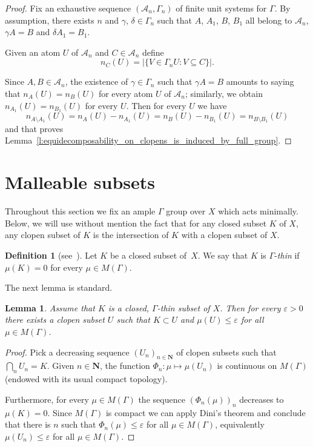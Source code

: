 \documentclass[10pt,a4paper]{article}
\newtheorem{lemm}[theo]{Lemma}
\theoremstyle{definition}
\newtheorem{defi}[theo]{Definition}
\newcommand{\N}{\mathbf{N}}
\newcommand{\mcA}{\mathcal{A}}
\begin{document}
\begin{proof}
Fix an exhaustive sequence $(\mcA_n,\Gamma_n)$ of finite unit systems for $\Gamma$. By assumption, there exists $n$ and $\gamma$, $\delta \in \Gamma_n$ such that $A$, $A_1$, $B$, $B_1$ all belong to $\mcA_n$, $\gamma A=B$ and $\delta A_1=B_1$.

Given an atom $U$ of $\mcA_n$ and $C \in \mcA_n$ define
\[
n_C(U)= \left|\{V \in \Gamma_n U : V \subseteq C\}\right|.
\]

Since $A,B \in \mcA_n$, the existence of $\gamma \in \Gamma_n$ such that $\gamma A=B$ amounts to saying that $n_A(U)=n_B(U)$ for every atom $U$ of $\mcA_n$; similarly, we obtain $n_{A_1}(U)= n_{B_1}(U)$ for every $U$. Then for every $U$ we have
\[
n_{A \setminus A_1}(U)=n_A(U) - n_{A_1}(U) = n_B(U)-n_{B_1}(U) = n_{B \setminus B_1}(U)
\]
and that proves Lemma~\ref{l:equidecomposability_on_clopens_is_induced_by_full_group}.
\end{proof}


\section{Malleable subsets}

Throughout this section we fix an ample $\Gamma$ group over $X$ which acts minimally. Below, we will use without mention the fact that for any closed subset $K$ of $X$, any clopen subset of $K$ is the intersection of $K$ with a clopen subset of $X$.

\begin{defi}
[{see~\cite[Definition~4.11]{Giordano2004}}]
Let $K$ be a closed subset of~$X$. We say that $K$ is $\Gamma$-\emph{thin} if $\mu(K)=0$ for every $\mu \in M(\Gamma)$.
\end{defi}

The next lemma is standard.

\begin{lemm}\label{l:small_clopen}
Assume that $K$ is a closed, $\Gamma$-thin subset of $X$. Then for every $\varepsilon >0$ there exists a clopen subset $U$ such that $K \subset U$ and $\mu(U) \le \varepsilon$ for all $\mu \in M(\Gamma)$.
\end{lemm}

\begin{proof}
Pick a decreasing sequence $(U_n)_{n \in \N}$ of clopen subsets such that\linebreak ${\bigcap_n U_n = K}$. Given $n \in \N$, the function $\Phi_n \colon \mu \mapsto \mu(U_n)$ is continuous on $M(\Gamma)$ (endowed with its usual compact topology).

Furthermore, for every $\mu \in M(\Gamma)$ the sequence $(\Phi_n(\mu))_n$ decreases to $\mu(K)=0$. Since $M(\Gamma)$ is compact we can apply Dini's theorem and conclude that there is $n$ such that $\Phi_n(\mu) \le \varepsilon$ for all $\mu \in M(\Gamma)$, equivalently $\mu(U_n) \le \varepsilon$ for all $\mu \in M(\Gamma)$.
\end{proof}
\end{document}
